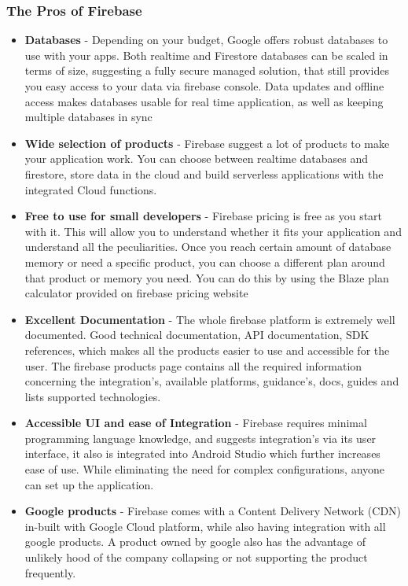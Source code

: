 \subsubsection{The Pros of Firebase}
\begin{itemize}
    \item \textbf{Databases} - Depending on your budget, Google offers robust databases to use with your apps. Both realtime and Firestore databases can be scaled in terms of size, suggesting a fully secure managed solution, that still provides you easy access to your data via firebase console. Data updates and offline access makes databases usable for real time application, as well as keeping multiple databases in sync
    \item \textbf{Wide selection of products} - Firebase suggest a lot of products to make your application work. You can choose between realtime databases and firestore, store data in the cloud and build serverless applications with the integrated Cloud functions.
    \item \textbf{Free to use for small developers} - Firebase pricing\cite{firebase_pricing} is free as you start with it. This will allow you to understand whether it fits your application and understand all the peculiarities. Once you reach certain amount of database memory or need a specific product, you can choose a different plan around that product or memory you need. You can do this by using the Blaze plan calculator provided on firebase pricing website\cite{firebase_pricing}
    \item \textbf{Excellent Documentation} - The whole firebase platform is extremely well documented. Good technical documentation, API documentation, SDK references, which makes all the products easier to use and accessible for the user. The firebase products page contains all the required information concerning the integration's, available platforms, guidance's, docs, guides and lists supported technologies.
    \item \textbf{Accessible UI and ease of Integration} - Firebase requires minimal programming language knowledge, and suggests integration's via its user interface, it also is integrated into Android Studio which further increases ease of use. While eliminating the need for complex configurations, anyone can set up the application.
    \item \textbf{Google products} - Firebase comes with a Content Delivery Network (CDN) in-built with Google Cloud platform, while also having integration with all google products. A product owned by google also has the advantage of unlikely hood of the company collapsing or not supporting the product frequently.
    
\end{itemize}

